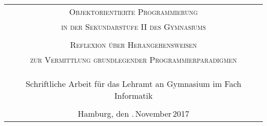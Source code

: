 \begin{titlepage}
\enlargethispage{\baselineskip}

\vspace*{15ex} 
\begin{tabular}{c}

 \\
 \large\textsc{Objektorientierte Programmierung}\\
\large\textsc{in der Sekundarstufe II des Gymnasiums} \\
\tiny \\
\normalsize\textsc{Reflexion über Herangehensweisen}\\
\normalsize\textsc{zur Vermittlung grundlegender Programmierparadigmen}\\		  
\\
\\
\\
\normalsize Schriftliche Arbeit für das Lehramt an Gymnasium im Fach Informatik\\
\\
\normalsize Hamburg, den .\,November\,2017

\end{tabular}


\end{titlepage}
